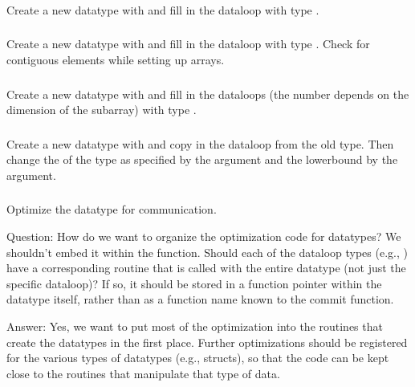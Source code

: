 \documentclass{article}
\begin{document}
\subsubsection{}
Create a new datatype with  and fill in the dataloop
with type .

\subsubsection{}
Create a new datatype with  and fill in the dataloop
with type .  Check for contiguous elements
while setting up arrays.

\subsubsection{}
Create a new datatype with  and fill in the
dataloops (the number depends on the dimension of the subarray) 
with type .

\subsubsection{}
Create a new datatype with  and copy in the
dataloop from the old type.  Then change the
 of the type as specified by the
 argument and the lowerbound by the  argument. 

\subsubsection{}
Optimize the datatype for communication.  

Question:  How do we want to organize the optimization code for datatypes?  We
shouldn't embed it within the  function.  Should each of
the dataloop types (e.g., ) have a corresponding routine
that is called with the entire datatype (not just the specific
dataloop)?  If so, it should be stored in a function pointer within
the datatype itself, rather than as a function name known to the
commit function.

Answer: Yes, we want to put most of the optimization into the routines
that create the datatypes in the first place.  Further optimizations
should be registered for the various types of datatypes (e.g.,
structs), so that the code can be kept close to the routines that
manipulate that type of data.
\end{document}
